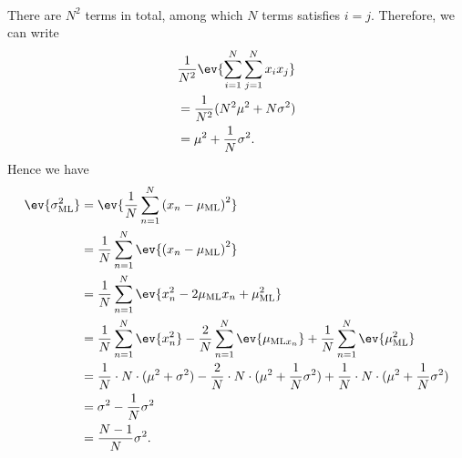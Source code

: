 \begin{answer}{}
\begin{align}
	\end{align}
	There are $N^2$ terms in total, among which $N$ terms satisfies $i = j$. Therefore, we can write
	\begin{align}
		&\frac{1}{N^2} \ev{\sum_{i=1}^{N}\sum_{j=1}^{N}x_i x_j}\\
		&= \frac{1}{N^2}(N^2 \mu^2 + N\sigma^2)\\
		&= \mu^2 + \frac{1}{N}\sigma^2.
	\end{align}
	Hence we have
	\begin{align}
		\ev{\sigma^2_{\mathrm{ML}}} &= \ev{\frac{1}{N} \sum_{n=1}^{N} \left( x_n - \mu_{\mathrm{ML}} \right)^2}\\
		&= \frac{1}{N} \sum_{n=1}^{N} \ev{ \left( x_n - \mu_{\mathrm{ML}} \right)^2}\\
		&= \frac{1}{N} \sum_{n=1}^{N} \ev{x_n^2 - 2\mu_{\mathrm{ML}}x_n + \mu_{\mathrm{ML}}^2}\\
		&= \frac{1}{N} \sum_{n=1}^{N} \ev{x_n^2} -\frac{2}{N}\sum_{n=1}^{N}\ev{\mu_{\mathrm{ML}x_n}} + \frac{1}{N} \sum_{n=1}^{N} \ev{\mu_{\mathrm{ML}}^2}\\
		&= \frac{1}{N} \cdot N \cdot (\mu^2 + \sigma^2) - \frac{2}{N} \cdot N \cdot (\mu^2 + \frac{1}{N}\sigma^2) + \frac{1}{N} \cdot N \cdot (\mu^2 + \frac{1}{N}\sigma^2)\\
		&= \sigma^2 - \frac{1}{N}\sigma^2\\
		&= \frac{N-1}{N}\sigma^2.
	\end{align}

\end{answer}